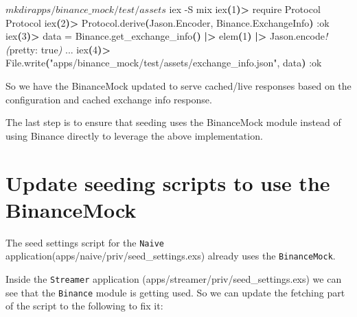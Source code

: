 \documentclass[
  oneside]{book}
\newenvironment{Shaded}{\begin{snugshade}}{\end{snugshade}}
\newcommand{\AttributeTok}[1]{\textcolor[rgb]{0.13,0.29,0.53}{#1}}
\newcommand{\ErrorTok}[1]{\textcolor[rgb]{0.64,0.00,0.00}{\textbf{#1}}}
\newcommand{\ExtensionTok}[1]{#1}
\newcommand{\KeywordTok}[1]{\textcolor[rgb]{0.13,0.29,0.53}{\textbf{#1}}}
\newcommand{\NormalTok}[1]{#1}
\newcommand{\OperatorTok}[1]{\textcolor[rgb]{0.81,0.36,0.00}{\textbf{#1}}}
\newcommand{\PreprocessorTok}[1]{\textcolor[rgb]{0.56,0.35,0.01}{\textit{#1}}}
\newcommand{\StringTok}[1]{\textcolor[rgb]{0.31,0.60,0.02}{#1}}
\begin{document}
\begin{Shaded}
\begin{Highlighting}[]
\ExtensionTok{$}\NormalTok{ mkdir apps/binance\_mock/test/assets}
\ExtensionTok{$}\NormalTok{ iex }\AttributeTok{{-}S}\NormalTok{ mix}
\ExtensionTok{iex}\ErrorTok{(}\ExtensionTok{1}\KeywordTok{)}\OperatorTok{\textgreater{}}\NormalTok{ require }\ExtensionTok{Protocol}
\ExtensionTok{Protocol}
\ExtensionTok{iex}\ErrorTok{(}\ExtensionTok{2}\KeywordTok{)}\OperatorTok{\textgreater{}}\NormalTok{ Protocol.derive}\KeywordTok{(}\ExtensionTok{Jason.Encoder,}\NormalTok{ Binance.ExchangeInfo}\KeywordTok{)}
\ExtensionTok{:ok}
\ExtensionTok{iex}\ErrorTok{(}\ExtensionTok{3}\KeywordTok{)}\OperatorTok{\textgreater{}}\NormalTok{ data }\ExtensionTok{=}\NormalTok{ Binance.get\_exchange\_info}\ErrorTok{(}\KeywordTok{)} \KeywordTok{|}\OperatorTok{\textgreater{}}\NormalTok{ elem}\KeywordTok{(}\ExtensionTok{1}\KeywordTok{)} \KeywordTok{|}\OperatorTok{\textgreater{}}\NormalTok{ Jason.encode}\PreprocessorTok{!(}\NormalTok{pretty: true}\PreprocessorTok{)}
\ExtensionTok{...}
\ExtensionTok{iex}\ErrorTok{(}\ExtensionTok{4}\KeywordTok{)}\OperatorTok{\textgreater{}}\NormalTok{ File.write}\KeywordTok{(}\StringTok{"apps/binance\_mock/test/assets/exchange\_info.json"}\ExtensionTok{,}\NormalTok{ data}\KeywordTok{)}
\ExtensionTok{:ok}
\end{Highlighting}
\end{Shaded}

So we have the BinanceMock updated to serve cached/live responses based on the configuration and cached exchange info response.

The last step is to ensure that seeding uses the BinanceMock module instead of using Binance directly to leverage the above implementation.

\section{Update seeding scripts to use the BinanceMock}\label{update-seeding-scripts-to-use-the-binancemock}

The seed settings script for the \texttt{Naive} application(apps/naive/priv/seed\_settings.exs) already uses the \texttt{BinanceMock}.

Inside the \texttt{Streamer} application (apps/streamer/priv/seed\_settings.exs) we can see that the \texttt{Binance} module is getting used. So we can update the fetching part of the script to the following to fix it:
\end{document}

